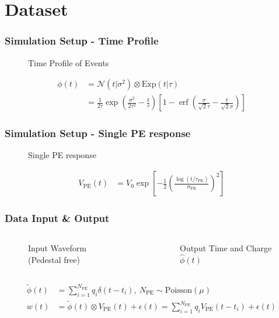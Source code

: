 \documentclass{beamer}
\DeclareMathOperator{\erf}{erf}
\begin{document}
\section{Dataset}

\begin{frame}
\frametitle{Simulation Setup - Time Profile}
\begin{figure}
    \centering
    \resizebox{0.4\textwidth}{!}{}
    \caption{Time Profile of Events}
\end{figure}
\begin{align*}
    \phi(t) &= \mathcal{N}(t|\sigma^2)\otimes \mathrm{Exp}(t|\tau) \\
    &= \frac{1}{2\tau} \exp\left(\frac{\sigma^2}{2\tau^2}-\frac{t}{\tau}\right) \left[1 - \erf\left( \frac{\sigma}{\sqrt{2}\tau} - \frac{t}{\sqrt{2}\sigma} \right)\right]
\end{align*}
\end{frame}

\begin{frame}
\frametitle{Simulation Setup - Single PE response}
\begin{figure}
    \centering
    \resizebox{0.6\textwidth}{!}{}
    \caption{Single PE response\cite{jetter_pmt_2012}}
\end{figure}
\begin{align*}
  V_\mathrm{PE}(t) &= V_{0}\exp\left[-\frac{1}{2}\left(\frac{\log(t/\tau_\mathrm{PE})}{\sigma_\mathrm{PE}}\right)^{2}\right]
\end{align*}
\end{frame}

\begin{frame}
\frametitle{Data Input \& Output}
\begin{columns}
\begin{figure}
    \centering
    \resizebox{1.0\textwidth}{!}{}
    \caption{Input Waveform (Pedestal free)}
\end{figure}
\begin{figure}
    \centering
    \resizebox{1.0\textwidth}{!}{}
    \caption{Output Time and Charge $\hat\phi(t)$}
\end{figure}
\end{columns}
\begin{align*}
  \tilde{\phi}(t) &= \sum_{i=1}^{N_{\mathrm{PE}}} q_i \delta(t-t_i), \ N_{\mathrm{PE}}\sim \mathrm{Poisson}(\mu) \\
  w(t) &= \tilde{\phi}(t) \otimes V_\mathrm{PE}(t) + \epsilon(t) = \sum_{i=1}^{N_\mathrm{PE}} q_i V_\mathrm{PE}(t-t_i) + \epsilon(t)
\end{align*}
\end{frame}
\end{document}

